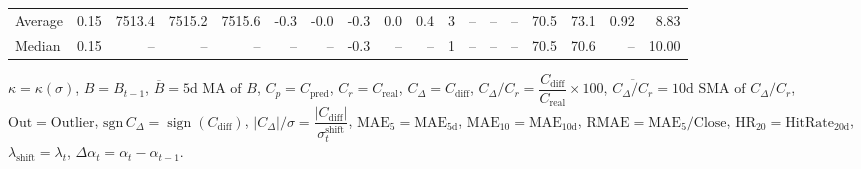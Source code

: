 \begin{threeparttable}
{\begin{tabular}{lrrrrrrrrrrrrrrrrr}
Average &     0.15 & 7513.4 & 7515.2 & 7515.6 &       -0.3 &           -0.0 &                      -0.3 &                      0.0 &                 0.4 &              3 &         -- &        -- &             -- &             70.5 &                73.1 &            0.92 &                   8.83 \\
 Median &     0.15 &     -- &     -- &     -- &         -- &             -- &                      -0.3 &                       -- &                  -- &              1 &         -- &        -- &             -- &             70.5 &                70.6 &              -- &                  10.00 \\
\bottomrule
\end{tabular}
}
\begin{tablenotes}\footnotesize
\item $\kappa=\kappa(\sigma)$, $B=B_{t-1}$, $\overline{B}=\text{5d MA of }B$, $C_p=C_{\text{pred}}$, $C_r=C_{\text{real}}$, $C_\Delta=C_{\text{diff}}$, $C_\Delta/C_r=\dfrac{C_{\text{diff}}}{C_{\text{real}}}\times100$, $\overline{C_\Delta/C_r}=\text{10d SMA of }C_\Delta/C_r$, $\mathrm{Out}=\text{Outlier}$, $\mathrm{sgn}\,C_\Delta=\operatorname{sign}(C_{\text{diff}})$, $|C_\Delta|/\sigma=\dfrac{|C_{\text{diff}}|}{\sigma_t^{\text{shift}}}$, $\mathrm{MAE}_5=\mathrm{MAE}_{5\text{d}}$, $\mathrm{MAE}_{10}=\mathrm{MAE}_{10\text{d}}$, $\mathrm{RMAE}= \mathrm{MAE}_5 / \text{Close}$, $\mathrm{HR}_{20}=\mathrm{HitRate}_{20\text{d}}$, $\lambda_{\text{shift}}=\lambda_t$, $\Delta\alpha_t=\alpha_t-\alpha_{t-1}$.
\end{tablenotes}
\end{threeparttable}
\endgroup

